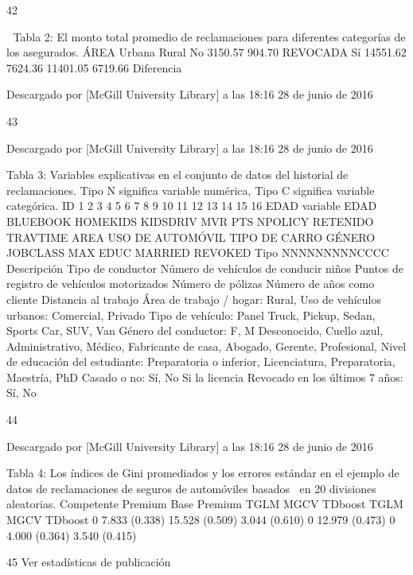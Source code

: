 \documentclass[]{article}
\begin{document}
42

 Tabla 2: El monto total promedio de reclamaciones para diferentes
categorías de los asegurados. ÁREA Urbana Rural No 3150.57 904.70
REVOCADA Sí 14551.62 7624.36 11401.05 6719.66 Diferencia

Descargado por {[}McGill University Library{]} a las 18:16 28 de junio
de 2016

43



Descargado por {[}McGill University Library{]} a las 18:16 28 de junio
de 2016

Tabla 3: Variables explicativas en el conjunto de datos del historial de
reclamaciones. Tipo N significa variable numérica, Tipo C significa
variable categórica. ID 1 2 3 4 5 6 7 8 9 10 11 12 13 14 15 16 EDAD
variable EDAD BLUEBOOK HOMEKIDS KIDSDRIV MVR PTS NPOLICY RETENIDO
TRAVTIME AREA USO DE AUTOMÓVIL TIPO DE CARRO GÉNERO JOBCLASS MAX EDUC
MARRIED REVOKED Tipo NNNNNNNNNCCCC Descripción Tipo de conductor Número
de vehículos de conducir niños Puntos de registro de vehículos
motorizados Número de pólizas Número de años como cliente Distancia al
trabajo Área de trabajo / hogar: Rural, Uso de vehículos urbanos:
Comercial, Privado Tipo de vehículo: Panel Truck, Pickup, Sedan, Sports
Car, SUV, Van Género del conductor: F, M Desconocido, Cuello azul,
Administrativo, Médico, Fabricante de casa, Abogado, Gerente,
Profesional, Nivel de educación del estudiante: Preparatoria o inferior,
Licenciatura, Preparatoria, Maestría, PhD Casado o no: Sí, No Si la
licencia Revocado en los últimos 7 años: Sí, No

44



Descargado por {[}McGill University Library{]} a las 18:16 28 de junio
de 2016

Tabla 4: Los índices de Gini promediados y los errores estándar en el
ejemplo de datos de reclamaciones de seguros de automóviles basados en
20 divisiones aleatorias. Competente Premium Base Premium TGLM MGCV
TDboost TGLM MGCV TDboost 0 7.833 (0.338) 15.528 (0.509) 3.044 (0.610) 0
12.979 (0.473) 0 4.000 (0.364) 3.540 (0.415)

45 Ver estadísticas de publicación
\end{document}
